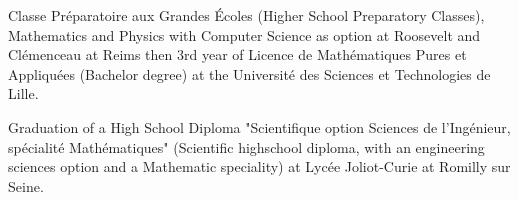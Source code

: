 \begin{rubric}{%
}
\entry*[2005 - 2009]
Classe Préparatoire aux Grandes Écoles (Higher School Preparatory Classes), Mathematics and Physics with Computer Science as option at Roosevelt and Clémenceau at Reims then 3\textup{rd} year of Licence de Mathématiques Pures et Appliquées (Bachelor degree) at the Université des Sciences et Technologies de Lille.


\entry*[2005]
Graduation of a High School Diploma "Scientifique option Sciences de l'Ingénieur, spécialité Mathématiques" (Scientific highschool diploma, with an engineering sciences option and a Mathematic speciality) at Lycée Joliot-Curie at Romilly sur Seine.





\end{rubric}
